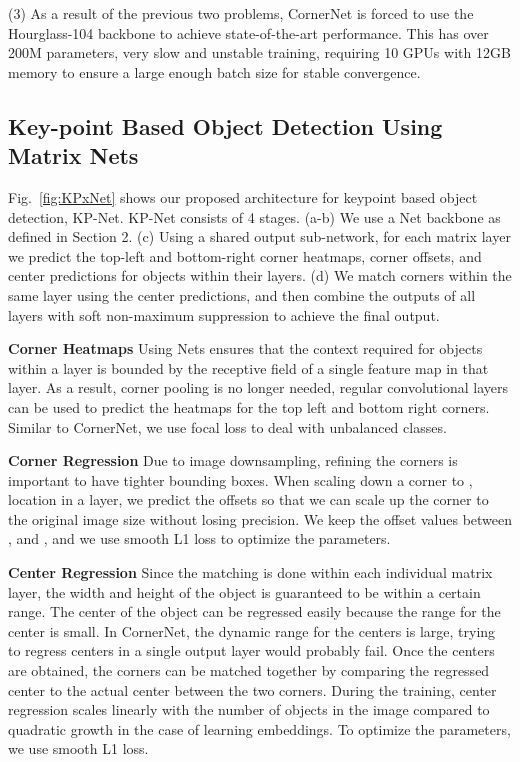 \documentclass[10pt,twocolumn,letterpaper]{article}
\begin{document}
(3) As a result of the previous two problems, CornerNet is forced to use the Hourglass-104 backbone to achieve state-of-the-art performance. This has over 200M parameters, very slow and unstable training, requiring 10 GPUs with 12GB memory to ensure a large enough batch size for stable convergence.

\subsection{Key-point Based Object Detection Using Matrix Nets}
\vspace{-0.25cm}
Fig.~\ref{fig:KPxNet} shows our proposed architecture for keypoint based object detection, KP-Net. KP-Net consists of 4 stages. (a-b) We use a Net backbone as defined in Section 2. (c) Using a shared output sub-network, for each matrix layer we predict the top-left and bottom-right corner heatmaps, corner offsets, and center predictions for objects within their layers. (d) We match corners within the same layer using the center predictions, and then combine the outputs of all layers with soft non-maximum suppression to achieve the final output.

\textbf{Corner Heatmaps}
Using Nets ensures that the context required for objects within a layer is bounded by the receptive field of a single feature map in that layer. As a result, corner pooling is no longer needed, regular convolutional layers can be used to predict the heatmaps for the top left and bottom right corners. Similar to CornerNet, we use focal loss to deal with unbalanced classes.

\textbf{Corner Regression}
Due to image downsampling, refining the corners is important to have tighter bounding boxes. When scaling down a corner to ,  location in a layer, we predict the offsets so that we can scale up the corner to the original image size without losing precision. We keep the offset values between , and , and we use smooth L1 loss to optimize the parameters.

\textbf{Center Regression}
Since the matching is done within each individual matrix layer,  the width and height of the object is guaranteed to be within a certain range. The center of the object can be regressed easily because the range for the center is small. In CornerNet, the dynamic range for the centers is large, trying to regress centers in a single output layer would probably fail. Once the centers are obtained, the corners can be matched together by comparing the regressed center to the actual center between the two corners. During the training, center regression scales linearly with the number of objects in the image compared to quadratic growth in the case of learning embeddings. To optimize the parameters, we use smooth L1 loss.
\end{document}
